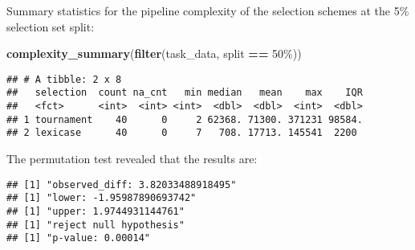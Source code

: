 \documentclass[
]{book}
\newenvironment{Shaded}{\begin{snugshade}}{\end{snugshade}}
\newcommand{\AttributeTok}[1]{\textcolor[rgb]{0.13,0.29,0.53}{#1}}
\newcommand{\DecValTok}[1]{\textcolor[rgb]{0.00,0.00,0.81}{#1}}
\newcommand{\FunctionTok}[1]{\textcolor[rgb]{0.13,0.29,0.53}{\textbf{#1}}}
\newcommand{\NormalTok}[1]{#1}
\newcommand{\OtherTok}[1]{\textcolor[rgb]{0.56,0.35,0.01}{#1}}
\newcommand{\SpecialCharTok}[1]{\textcolor[rgb]{0.81,0.36,0.00}{\textbf{#1}}}
\newcommand{\StringTok}[1]{\textcolor[rgb]{0.31,0.60,0.02}{#1}}
\begin{document}
Summary statistics for the pipeline complexity of the selection schemes at the 5\% selection set split:

\begin{Shaded}
\begin{Highlighting}[]
\FunctionTok{complexity\_summary}\NormalTok{(}\FunctionTok{filter}\NormalTok{(task\_data, split }\SpecialCharTok{==} \StringTok{\textquotesingle{}50\%\textquotesingle{}}\NormalTok{))}
\end{Highlighting}
\end{Shaded}

\begin{verbatim}
## # A tibble: 2 x 8
##   selection  count na_cnt   min median   mean    max    IQR
##   <fct>      <int>  <int> <int>  <dbl>  <dbl>  <int>  <dbl>
## 1 tournament    40      0     2 62368. 71300. 371231 98584.
## 2 lexicase      40      0     7   708. 17713. 145541  2200
\end{verbatim}

The permutation test revealed that the results are:

\begin{Shaded}
\end{Shaded}

\begin{verbatim}
## [1] "observed_diff: 3.82033488918495"
## [1] "lower: -1.95987890693742"
## [1] "upper: 1.9744931144761"
## [1] "reject null hypothesis"
## [1] "p-value: 0.00014"
\end{verbatim}
\end{document}
